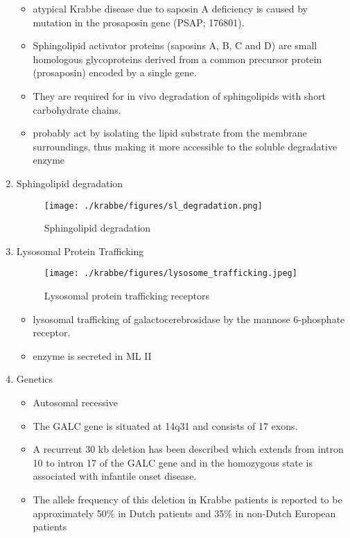 \documentclass{scrartcl}
\begin{document}
\begin{enumerate}
\begin{itemize}
\item atypical Krabbe disease due to saposin A deficiency is caused by mutation in the prosaposin gene (PSAP; 176801).
\item Sphingolipid activator proteins (saposins A, B, C and D) are small
homologous glycoproteins derived from a common precursor protein
(prosaposin) encoded by a single gene.
\item They are required for in vivo degradation of sphingolipids with short carbohydrate chains.
\item probably act by isolating the lipid substrate from the membrane
surroundings, thus making it more accessible to the soluble
degradative enzyme
\end{itemize}

\item Sphingolipid degradation
\label{sec:org7ffd844}

\begin{figure}[htbp]
\centering
\texttt{[image: ./krabbe/figures/sl\_degradation.png]}
\caption{\label{fig:org8b563b3}
Sphingolipid degradation}
\end{figure}

\item Lysosomal Protein Trafficking
\label{sec:orga71cbbd}

\begin{figure}[htbp]
\centering
\texttt{[image: ./krabbe/figures/lysosome\_trafficking.jpeg]}
\caption{\label{fig:org3e62ec2}
Lysosomal protein trafficking receptors}
\end{figure}

\footnotesize
\begin{itemize}
\item lysosomal trafficking of galactocerebrosidase by the mannose 6-phosphate receptor.
\item enzyme is secreted in ML II
\end{itemize}

\item Genetics
\label{sec:org2e1158d}
\begin{itemize}
\item Autosomal recessive
\item The GALC gene is situated at 14q31 and consists of 17 exons.
\item A recurrent 30 kb deletion has been described which extends from
intron 10 to intron 17 of the GALC gene and in the homozygous state
is associated with infantile onset disease.
\item The allele frequency of this deletion in Krabbe patients is reported
to be approximately 50\% in Dutch patients and 35\% in non-Dutch
European patients
\end{itemize}
\end{enumerate}
\end{document}
